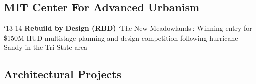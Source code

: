 \subsection*{MIT Center For Advanced Urbanism}



\begin{tablist}

   \item[`13-14] \tab \textbf{Rebuild by Design (RBD)}
   {‘The New Meadowlands’: Winning entry for \$150M HUD multistage planning and design competition following hurricane Sandy in the Tri-State area}
\end{tablist}


\subsection*{Architectural Projects}


